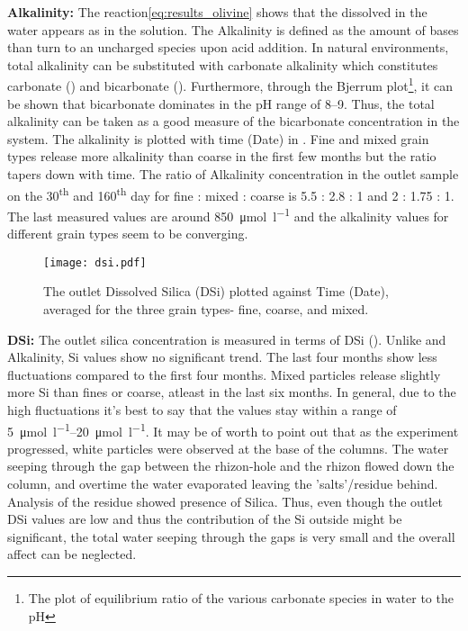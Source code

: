 \noindent \textbf{Alkalinity:} The reaction\;\ref{eq:results_olivine} shows that the dissolved  in the water appears as  in the solution. The Alkalinity is defined as the amount of bases than turn to an uncharged species upon acid addition. In natural environments, total alkalinity can be substituted with carbonate alkalinity which constitutes carbonate () and bicarbonate (). Furthermore, through the Bjerrum plot\footnote{The plot of equilibrium ratio of the various carbonate species in water to the pH}, it can be shown that bicarbonate dominates in the pH range of \numrange{8}{9}. Thus, the total alkalinity can be taken as a good measure of the bicarbonate concentration in the system. The alkalinity is plotted with time (Date) in . Fine and mixed grain types release more alkalinity than coarse in the first few months but the ratio tapers down with time. The ratio of Alkalinity concentration in the outlet sample on the 30\textsuperscript{th} and 160\textsuperscript{th} day for fine : mixed : coarse is 5.5 : 2.8 : 1 and 2 : 1.75 : 1. The last measured values are  around \SI{850}{\micro\mole\per\litre} and the alkalinity values for different grain types seem to be converging.\\

\begin{figure}[h]
\centering
\texttt{[image: dsi.pdf]}
\caption{The outlet Dissolved Silica (DSi) plotted against Time (Date), averaged for the three grain types- fine, coarse, and mixed.}
\label{fig:results_dsi}
\end{figure}

\noindent \textbf{DSi:} The outlet silica concentration is measured in terms of DSi  (). Unlike  and Alkalinity, Si values show no significant trend. The last four months show less fluctuations compared to the first four months. Mixed particles release slightly more Si than fines or coarse, atleast in the last six months. In general, due to the high fluctuations it's best to say that the values stay within a range of \SIrange{5}{20}{\micro\mole\per\litre}. It may be of worth to point out that as the experiment progressed, white particles were observed at the base of the columns. The water seeping through the gap between the rhizon-hole and the rhizon flowed down the column, and overtime the water evaporated leaving the 'salts'/residue behind. Analysis of the residue showed presence of Silica. Thus, even though the outlet DSi values are low and thus the contribution of the Si outside might be significant, the total water seeping through the gaps is very small and the overall affect can be neglected. \\

